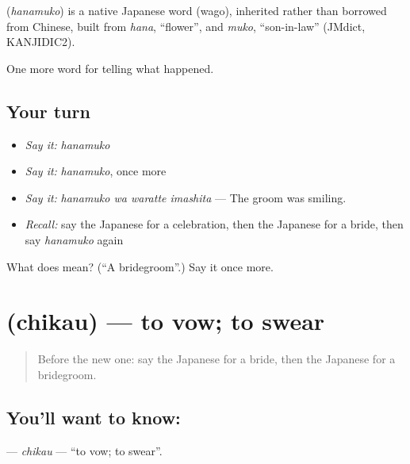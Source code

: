 \begin{cousinweb}
\textbf{} (\emph{hanamuko}) is a native Japanese word (wago), inherited rather than borrowed from Chinese, built from \emph{hana}, \textquotedblleft{}flower\textquotedblright{}, and \emph{muko}, \textquotedblleft{}son-in-law\textquotedblright{} (JMdict, KANJIDIC2).
\end{cousinweb}

\begin{grammarlens}[title={What you've built}]
One more word for telling what happened.
\end{grammarlens}

\subsection*{Your turn}
\begin{itemize}
\raggedright
  \item \emph{Say it:} \emph{hanamuko}
  \item \emph{Say it:} \emph{hanamuko}, once more
  \item \emph{Say it:} \emph{hanamuko wa waratte imashita} — The groom was smiling.
  \item \emph{Recall:} say the Japanese for a celebration, then the Japanese for a bride, then say \emph{hanamuko} again
\end{itemize}

\begin{tcolorbox}[breakable,colback=teal!4,colframe=teal!35!black,title={Before you move on}]
What does  mean? (\textquotedblleft{}A bridegroom\textquotedblright{}.) Say it once more.
\end{tcolorbox}
\section[\texorpdfstring{\ja{ちかう} (chikau)}{ちかう (chikau)}]{ (chikau) — to vow; to swear}

\label{lesson:JA-C289-chikau}



\begin{quote}
Before the new one: say the Japanese for a bride, then the Japanese for a bridegroom.
\end{quote}

\subsection*{You'll want to know: }
\textbf{} — \emph{chikau} — \textquotedblleft{}to vow; to swear\textquotedblright{}.

